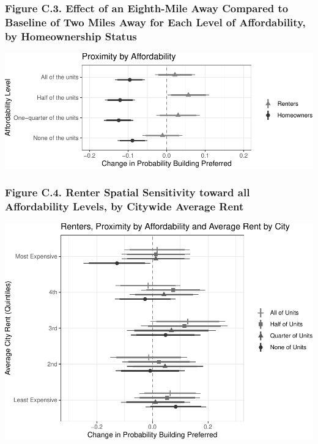 \documentclass[]{article}
\begin{document}
\hypertarget{figure-c.3.-effect-of-an-eighth-mile-away-compared-to-baseline-of-two-miles-away-for-each-level-of-affordability-by-homeownership-status}{%
\subsubsection{Figure C.3. Effect of an Eighth-Mile Away Compared to Baseline of Two Miles Away for Each Level of Affordability, by Homeownership Status}\label{figure-c.3.-effect-of-an-eighth-mile-away-compared-to-baseline-of-two-miles-away-for-each-level-of-affordability-by-homeownership-status}}

\includegraphics{Zheng-Ruth-Renters-Paper_files/figure-latex/Figure C.3 print-1.pdf}

\hypertarget{figure-c.4.-renter-spatial-sensitivity-toward-all-affordability-levels-by-citywide-average-rent}{%
\subsubsection{Figure C.4. Renter Spatial Sensitivity toward all Affordability Levels, by Citywide Average Rent}\label{figure-c.4.-renter-spatial-sensitivity-toward-all-affordability-levels-by-citywide-average-rent}}

\includegraphics{Zheng-Ruth-Renters-Paper_files/figure-latex/Figure C.4 print-1.pdf}
\end{document}

